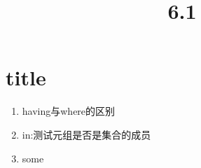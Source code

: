 \documentclass[UTF8]{article}
\title{\textbf{6.1}}
\begin{document}
	\maketitle
	\section{title}
	\begin{enumerate}
		\item having与where的区别
		\item in:测试元组是否是集合的成员
		\item some
	\end{enumerate}
\end{document}
